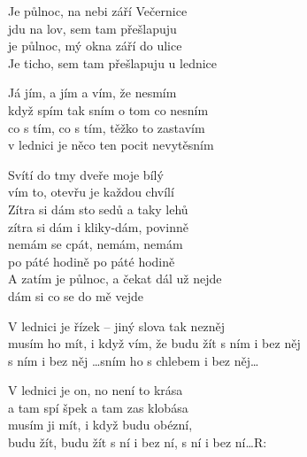 
\ve{}
Je půlnoc, na nebi září Večernice\\
jdu na lov, sem tam přešlapuju\\
je půlnoc, mý okna září do ulice\\
Je ticho, sem tam přešlapuju u lednice

\cho{}
Já jím, a jím a vím, že nesmím\\
když spím tak sním o tom co nesním\\
co s tím, co s tím, těžko to zastavím\\
v lednici je něco ten pocit nevytěsním

\ve{}
Svítí do tmy dveře moje bílý\\
vím to, otevřu je každou chvílí\\
Zítra si dám sto sedů a taky lehů\\
zítra si dám i kliky-dám, povinně\\
nemám se cpát, nemám, nemám\\
po páté hodině po páté hodině\\
A zatím je půlnoc, a čekat dál už nejde\\
dám si co se do mě vejde 

\cho{}

\ve{}
V lednici je řízek -- jiný slova tak nezněj\\
musím ho mít, i když vím, že budu žít s ním i bez něj\\
s ním i bez něj \ldots{}sním ho s chlebem i bez něj\ldots

V lednici je on, no není to krása\\
a tam spí špek a tam zas klobása\\
musím ji mít, i když budu obézní,\\
budu žít, budu žít s ní i bez ní, s ní i bez ní\ldots \hspace{1.5cm}R:

\esong{}